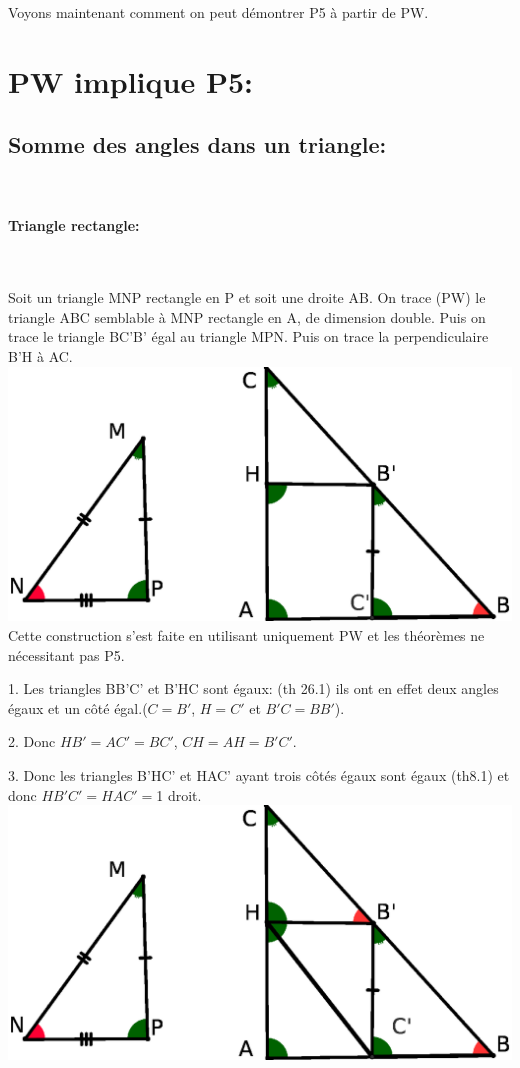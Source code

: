 \documentclass[a4paper, 12pt, twoside]{book}
\begin{document}
 Voyons maintenant comment on peut démontrer P5 à partir de PW.
 
 \section{PW implique P5:}
 
 
\subsection{Somme des angles dans un triangle:}\
 
 \paragraph{Triangle rectangle:}\
 
 
 Soit un triangle MNP rectangle en P et soit une droite AB. On trace (PW) le triangle ABC semblable à MNP rectangle en A, de dimension double. Puis on trace le triangle BC'B' égal au triangle MPN. Puis on trace la perpendiculaire B'H à AC.\\
 
  
 \includegraphics[scale=0.5]{figures/WALLIS3.eps} \\
 
 Cette construction s'est faite en utilisant uniquement PW et les théorèmes ne nécessitant pas P5.\
 
 1. Les triangles BB'C' et B'HC sont égaux: (th 26.1) ils ont en effet deux angles égaux et un côté égal.($C=B'$, $H=C'$ et $B'C=BB'$).\
 
 2. Donc $HB'=AC'=BC'$, $CH=AH=B'C'$.\
  
  
  3. Donc les triangles B'HC' et HAC' ayant trois côtés égaux sont égaux (th8.1) et donc $HB'C'=HAC'=$1 droit.\\
 
  \includegraphics[scale=0.4]{figures/WALLIS4.eps} \\
  
\end{document}
